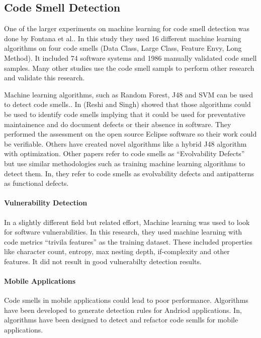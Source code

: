 \documentclass[conference]{IEEEtran}
\begin{document}
\subsection{Code Smell Detection}
One of the larger experiments on machine learning for code smell detection was done by Fontana et al.\cite{arcelli_fontana_comparing_2016}. In this study they used 16 different machine learning algorithms on four code smells (Data Class, Large Class, Feature Envy, Long Method). It included 74 software systems and 1986 manually validated code smell samples. Many other studies use the code smell sampls to perform other research and validate this research.

Machine learning algorithms, such as Random Forest, J48 and SVM can be used to detect code smells.\cite{reshi_investigating_2019}\cite{karaduzovic-hadziabdic_comparison_2018}\cite{reshi_predicting_2018}\cite{nucci_detecting_2018}\cite{karaduzovic-hadziabdic_comparison_2018}. In\cite{reshi_investigating_2019}\cite{reshi_predicting_2018} (Reshi and Singh) showed that those algorithms could be used to identify code smells implying that it could be used for preventative maintainence and do document defects or their absence in software. They performed the assessment on the open source Eclipse software so their work could be verifiable. Others have created novel algorithms\cite{kaur_sp-j48:_2019} like a hybrid J48 algorithm with optimization.
Other papers refer to code smells as ``Evolvability Defects''\cite{tsuda_machine_2018} but use similar methodologies such as training machine learning algorithms to detect them. In\cite{tsuda_machine_2018}, they refer to code smells as evolvability defects and antipatterns as functional defects.

\paragraph{Vulnerability Detection}
In a slightly different field but related effort, Machine learning was used to look for software vulnerabilities\cite{chernis_machine_2018}. In this research, they used machine learning with code metrics ``trivila features'' as the training dataset. These included properties like character count, entropy, max nesting depth, if-complexity and other features. It did not result in good vulnerabilty detection results.

\paragraph{Mobile Applications}
Code smells in mobile applications could lead to poor performance. Algorithms have been developed\cite{rubin_sniffing_2019}\cite{ibrahim_reducing_2018} to generate detection rules for Andriod applications. In\cite{ibrahim_reducing_2018}, algorithms have been designed to detect and refactor code semlls for mobile applications.
\end{document}
